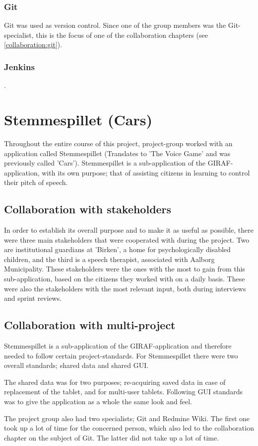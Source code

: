 \subsubsection{Git}
Git was used as version control.
Since one of the group members was the Git-specialist, this is the focus of one of the collaboration chapters (see \ref{collaboration:git}).

\subsubsection{Jenkins}
.

\section{Stemmespillet (Cars)}
Throughout the entire course of this project, project-group worked with an application called Stemmespillet (Translates to 'The Voice Game' and was previously called 'Cars').
Stemmespillet is a sub-application of the GIRAF-application, with its own purpose; that of assisting citizens in learning to control their pitch of speech.

\subsection{Collaboration with stakeholders}
In order to establish its overall purpose and to make it as useful as possible, there were three main stakeholders that were cooperated with during the project.
Two are institutional guardians at 'Birken', a home for psychologically disabled children, and the third is a speech therapist, associated with Aalborg Municipality.
These stakeholders were the ones with the most to gain from this sub-application, based on the citizens they worked with on a daily basis.
These were also the stakeholders with the most relevant input, both during interviews and sprint reviews.

\subsection{Collaboration with multi-project}
Stemmespillet is a sub-application of the GIRAF-application and therefore needed to follow certain project-standards.
For Stemmespillet there were two overall standards; shared data and shared GUI.

The shared data was for two purposes; re-acquiring saved data in case of replacement of the tablet, and for multi-user tablets.
Following GUI standards was to give the application as a whole the same look and feel.

The project group also had two specialists; Git and Redmine Wiki.
The first one took up a lot of time for the concerned person, which also led to the collaboration chapter on the subject of Git.
The latter did not take up a lot of time.


